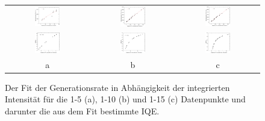 \begin{figure}[H]
\begin{tabular}{ccc}
  \includegraphics[width=0.32\textwidth]{Bilder/RaumtempBilder/genfit1-10.png} & \includegraphics[width=0.32\textwidth]{Bilder/RaumtempBilder/genfit1-20.png}  & \includegraphics[width=0.32\textwidth]{Bilder/RaumtempBilder/genfit1-20.png} \\
 \includegraphics[width=0.32\textwidth]{Bilder/RaumtempBilder/iqe1-10.png} &   \includegraphics[width=0.32\textwidth]{Bilder/RaumtempBilder/iqe1-15.png} & \includegraphics[width=0.32\textwidth]{Bilder/RaumtempBilder/iqe1-20.png}  \\
 a & b & c
\end{tabular}
\caption{Der Fit der Generationsrate in Abhängigkeit der integrierten Intensität für die 1-5 (a), 1-10 (b) und 1-15 (c) Datenpunkte und darunter die aus dem Fit bestimmte IQE.}
\label{fig:raumtemp}
\end{figure}
